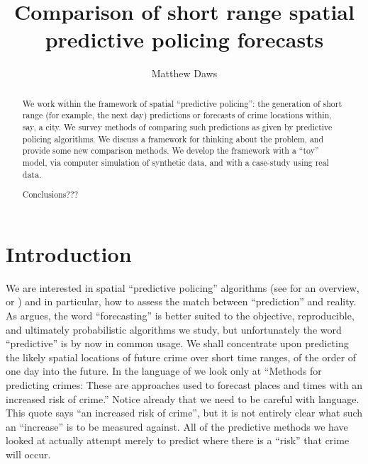 \documentclass[twoside,a4paper,twocolumn,10pt]{article}
\theoremstyle{plain}
\theoremstyle{definition}
\begin{document}
\title{Comparison of short range spatial predictive policing forecasts}
\author{Matthew Daws}
\maketitle

\begin{abstract}
We work within the framework of spatial ``predictive policing'': the generation of
short range (for example, the next day) predictions or forecasts of crime locations within,
say, a city.  We survey methods of comparing such predictions as given by predictive policing
algorithms.  We discuss a framework for thinking about the problem, and provide some new
comparison methods.  We develop the framework with a ``toy'' model, via computer simulation
of synthetic data, and with a case-study using real data.

Conclusions???
\end{abstract}



\section{Introduction}

We are interested in spatial ``predictive policing'' algorithms (see
\cite{rand} for an overview, or \cite{arc,bjp,ctu,jbmbp,levine,sepp,rdbjc})
and in particular,
how to assess the match between ``prediction'' and reality.  As \cite[Summary]{rand}
argues, the word ``forecasting'' is better suited to the objective, reproducible, and
ultimately probabilistic algorithms we study, but unfortunately the word ``predictive''
is by now in common usage.
We shall concentrate upon predicting the likely spatial locations of future crime
over short time ranges, of the order of one day into the future.  In the language
of \cite{rand} we look only at ``Methods for predicting crimes: These are approaches
used to forecast places and times with an increased risk of crime.''  Notice already
that we need to be careful with language.  This quote says ``an increased risk of
crime'', but it is not entirely clear what such an ``increase'' is to be measured
against.  All of the predictive methods we have looked at actually attempt merely
to predict where there is a ``risk'' that crime will occur.
\end{document}

